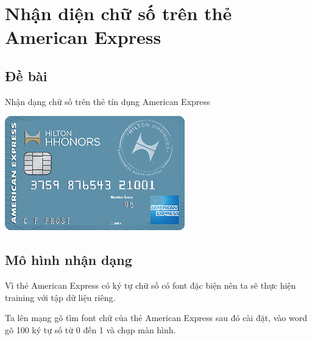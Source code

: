 \section{Nhận diện chữ số trên thẻ American Express}

\subsection{Đề bài}
Nhận dạng chữ số trên thẻ tín dụng American Express
\begin{center}
    \includegraphics[scale = 1]{images/americanexpress/inputAmericanExpress}
\end{center}

\subsection{Mô hình nhận dạng}

\quad Vì thẻ American Express có ký tự chữ số có font đặc biện nên ta sẽ thực
hiện training với tập dữ liệu riêng.

    \quad Ta lên mạng gõ tìm font chữ của thẻ American Express sau đó cài đặt, vào word
gõ 100 ký tự số từ 0 đến 1 và chụp màn hình. 

